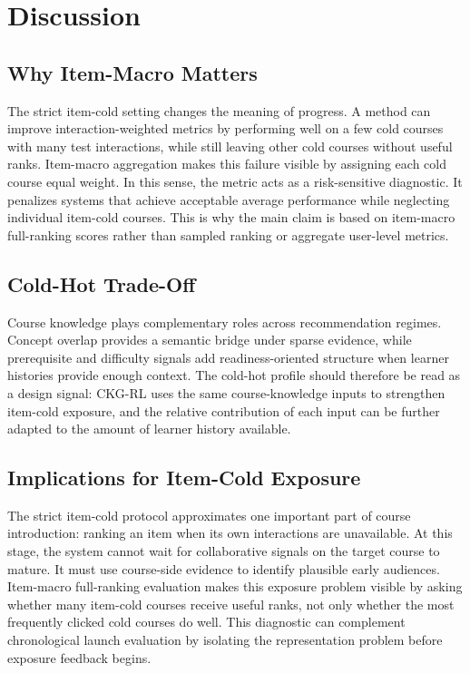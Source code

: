\documentclass[sigconf,anonymous,review]{acmart}
\begin{document}
\section{Discussion}
\subsection{Why Item-Macro Matters}
The strict item-cold setting changes the meaning of progress. A method can improve interaction-weighted metrics by performing well on a few cold courses with many test interactions, while still leaving other cold courses without useful ranks. Item-macro aggregation makes this failure visible by assigning each cold course equal weight. In this sense, the metric acts as a risk-sensitive diagnostic. It penalizes systems that achieve acceptable average performance while neglecting individual item-cold courses. This is why the main claim is based on item-macro full-ranking scores rather than sampled ranking or aggregate user-level metrics.

\subsection{Cold-Hot Trade-Off}
Course knowledge plays complementary roles across recommendation regimes. Concept overlap provides a semantic bridge under sparse evidence, while prerequisite and difficulty signals add readiness-oriented structure when learner histories provide enough context. The cold-hot profile should therefore be read as a design signal: CKG-RL uses the same course-knowledge inputs to strengthen item-cold exposure, and the relative contribution of each input can be further adapted to the amount of learner history available.

\subsection{Implications for Item-Cold Exposure}
The strict item-cold protocol approximates one important part of course introduction: ranking an item when its own interactions are unavailable. At this stage, the system cannot wait for collaborative signals on the target course to mature. It must use course-side evidence to identify plausible early audiences. Item-macro full-ranking evaluation makes this exposure problem visible by asking whether many item-cold courses receive useful ranks, not only whether the most frequently clicked cold courses do well. This diagnostic can complement chronological launch evaluation by isolating the representation problem before exposure feedback begins.
\end{document}
